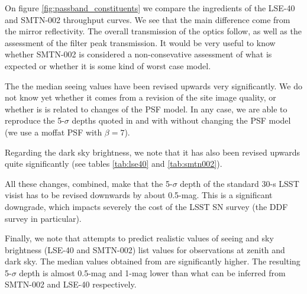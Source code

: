 \documentclass[\docopts]{\docclass}
\begin{document}
On figure \ref{fig:passband_constituents} we compare the ingredients
of the LSE-40 and SMTN-002 throughput curves.  We see that the main
difference come from the mirror reflectivity. The overall transmission
of the optics follow, as well as the assessment of the filter peak
transmission.  It would be very useful to know whether SMTN-002 is
considered a non-consevative assessment of what is expected or whether
it is some kind of worst case model.

The the median seeing values have been revised upwards very
significantly. We do not know yet whether it comes from a revision of
the site image quality, or whether is is related to changes of the PSF
model. In any case, we are able to reproduce the 5-$\sigma$ depths
quoted in \cite{LSE-40} and \cite{SMTN-002} with  without
changing the PSF model (we use a moffat PSF with $\beta=7$).

Regarding the dark sky brightness, we note that it has also been
revised upwards quite significantly (see tables \ref{tab:lse40} and
\ref{tab:smtn002}).

All these changes, combined, make that the 5-$\sigma$ depth of the
standard 30-s LSST visist has to be revised downwards by about
0.5-mag. This is a significant downgrade, which impacts severely the
cost of the LSST SN survey (the DDF survey in particular).

Finally, we note that  attempts to predict realistic
values of seeing and sky brightness (LSE-40 and SMTN-002) list values
for observations at zenith and dark sky. The median values obtained
from  are significantly higher. The resulting 5-$\sigma$
depth is almost 0.5-mag and 1-mag lower than what can be inferred from
SMTN-002 and LSE-40 respectively. 
\end{document}
